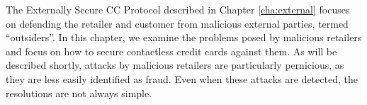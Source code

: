 The Externally Secure CC Protocol described in Chapter \ref{cha:external} focuses on defending the retailer and customer from malicious external parties, termed ``outsiders''.
In this chapter, we examine the problems posed by malicious retailers and focus on how to secure contactless credit cards against them.
As will be described shortly, attacks by malicious retailers are particularly pernicious, as they are less easily identified as fraud.
Even when these attacks are detected, the resolutions are not always simple.
